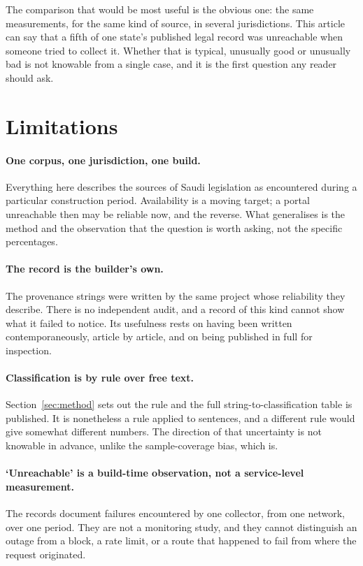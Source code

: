 \documentclass[11pt]{article}
\begin{document}
The comparison that would be most useful is the obvious one: the same
measurements, for the same kind of source, in several jurisdictions. This
article can say that a fifth of one state's published legal record was
unreachable when someone tried to collect it. Whether that is typical,
unusually good or unusually bad is not knowable from a single case, and it is
the first question any reader should ask.

\section{Limitations}

\paragraph{One corpus, one jurisdiction, one build.} Everything here describes
the sources of Saudi legislation as encountered during a particular
construction period. Availability is a moving target; a portal unreachable then
may be reliable now, and the reverse. What generalises is the method and the
observation that the question is worth asking, not the specific percentages.

\paragraph{The record is the builder's own.} The provenance strings were
written by the same project whose reliability they describe. There is no
independent audit, and a record of this kind cannot show what it failed to
notice. Its usefulness rests on having been written contemporaneously, article
by article, and on being published in full for inspection.

\paragraph{Classification is by rule over free text.} Section~\ref{sec:method}
sets out the rule and the full string-to-classification table is published. It
is nonetheless a rule applied to sentences, and a different rule would give
somewhat different numbers. The direction of that uncertainty is not knowable
in advance, unlike the sample-coverage bias, which is.

\paragraph{`Unreachable' is a build-time observation, not a service-level
measurement.} The records document failures encountered by one collector, from
one network, over one period. They are not a monitoring study, and they cannot
distinguish an outage from a block, a rate limit, or a route that happened to
fail from where the request originated.
\end{document}
